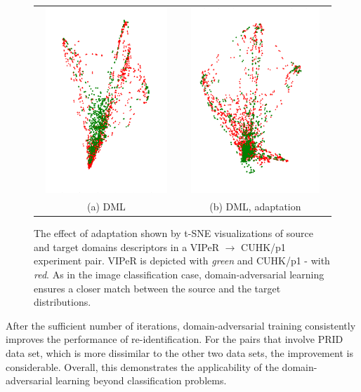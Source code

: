 \begin{figure}
\centering
\begin{tabular}{c c}
\includegraphics[height=7cm, width=7cm]{./Chapters/gradrev/figures/reid_adapt_results/viper_cuhkp1_zc.png}&
\includegraphics[height=7cm, width=7cm]{./Chapters/gradrev/figures/reid_adapt_results/viper_cuhkp1_da.png}\\
\small{(a) DML}&
\small{(b) DML, adaptation}\\
\end{tabular}
\caption{The effect of adaptation shown by t-SNE visualizations of source and target domains descriptors in a VIPeR $\rightarrow$ CUHK/p1 experiment pair. VIPeR is depicted with \textit{green} and CUHK/p1 - with \textit{red}. As in the image classification case, domain-adversarial learning ensures a closer match between the source and the target distributions. }
\label{fig:reidtsne}
\end{figure}


After the sufficient number of iterations, domain-adversarial training consistently improves the performance of re-identification. For the pairs that involve PRID data set, which is more dissimilar to the other two data sets, the improvement is considerable. Overall, this demonstrates the applicability of the domain-adversarial learning beyond classification problems.


